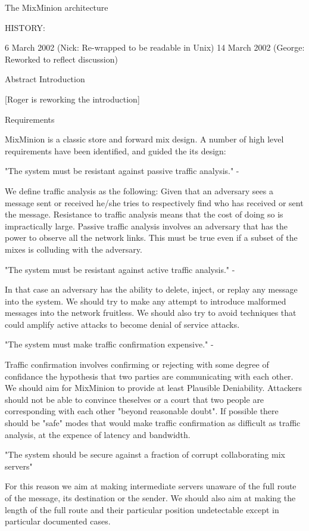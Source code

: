 The MixMinion architecture

HISTORY:

 6 March 2002 (Nick: Re-wrapped to be readable in Unix)
14 March 2002 (George: Reworked to reflect discussion)

Abstract
Introduction

[Roger is reworking the introduction]

Requirements

MixMinion is a classic store and forward mix design. A number of high
level requirements have been identified, and guided the its design:

     "The system must be resistant against passive traffic analysis." -

We define traffic analysis as the following: Given that an adversary
sees a message sent or received he/she tries to respectively find who
has received or sent the message. Resistance to traffic analysis means
that the cost of doing so is impractically large. Passive traffic
analysis involves an adversary that has the power to observe all the
network links. This must be true even if a subset of the mixes is
colluding with the adversary.

     "The system must be resistant against active traffic analysis." - 

In that case an adversary has the ability to delete, inject, or replay 
any message into the system. We should try to make any attempt to
introduce malformed messages into the network fruitless. We should
also try to avoid techniques that could amplify active attacks to
become denial of service attacks.


     "The system must make traffic confirmation expensive." -
 
Traffic confirmation involves confirming or rejecting with some degree
of confidance the hypothesis that two parties are communicating with
each other. We should aim for MixMinion to provide at least Plausible 
Deniability. Attackers should not be able to convince theselves or a
court that two people are corresponding with each other "beyond
reasonable doubt". If possible there should be "safe" modes that would 
make traffic confirmation as difficult as traffic analysis, at the
expence of latency and bandwidth.

     "The system should be secure against a fraction of corrupt 
     collaborating mix servers"

For this reason we aim at making intermediate servers unaware of 
the full route of the message, its destination or the sender. We
should also aim at making the length of the full route and their
particular position undetectable except in particular documented
cases. 

